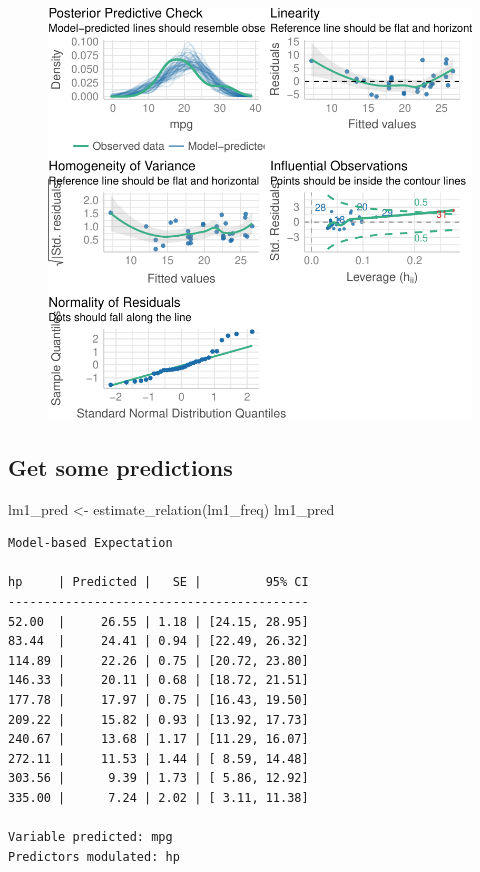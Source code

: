 \documentclass[
  letterpaper,
  DIV=11,
  numbers=noendperiod]{scrreprt}
\newenvironment{Shaded}{\begin{snugshade}}{\end{snugshade}}
\newcommand{\FunctionTok}[1]{\textcolor[rgb]{0.28,0.35,0.67}{#1}}
\newcommand{\NormalTok}[1]{\textcolor[rgb]{0.00,0.23,0.31}{#1}}
\newcommand{\OtherTok}[1]{\textcolor[rgb]{0.00,0.23,0.31}{#1}}
\theoremstyle{definition}
\theoremstyle{definition}
\theoremstyle{remark}
\begin{document}
\begin{figure}[H]

{\centering \includegraphics[width=1\textwidth,height=\textheight]{./regression1_files/figure-pdf/checkmodel-lm1-bayes-1.pdf}

}

\end{figure}

\hypertarget{get-some-predictions}{%
\subsection{Get some predictions}\label{get-some-predictions}}

\begin{Shaded}
\begin{Highlighting}[]
\NormalTok{lm1\_pred }\OtherTok{\textless{}{-}} \FunctionTok{estimate\_relation}\NormalTok{(lm1\_freq)}
\NormalTok{lm1\_pred}
\end{Highlighting}
\end{Shaded}

\begin{verbatim}
Model-based Expectation

hp     | Predicted |   SE |         95% CI
------------------------------------------
52.00  |     26.55 | 1.18 | [24.15, 28.95]
83.44  |     24.41 | 0.94 | [22.49, 26.32]
114.89 |     22.26 | 0.75 | [20.72, 23.80]
146.33 |     20.11 | 0.68 | [18.72, 21.51]
177.78 |     17.97 | 0.75 | [16.43, 19.50]
209.22 |     15.82 | 0.93 | [13.92, 17.73]
240.67 |     13.68 | 1.17 | [11.29, 16.07]
272.11 |     11.53 | 1.44 | [ 8.59, 14.48]
303.56 |      9.39 | 1.73 | [ 5.86, 12.92]
335.00 |      7.24 | 2.02 | [ 3.11, 11.38]

Variable predicted: mpg
Predictors modulated: hp
\end{verbatim}
\end{document}
